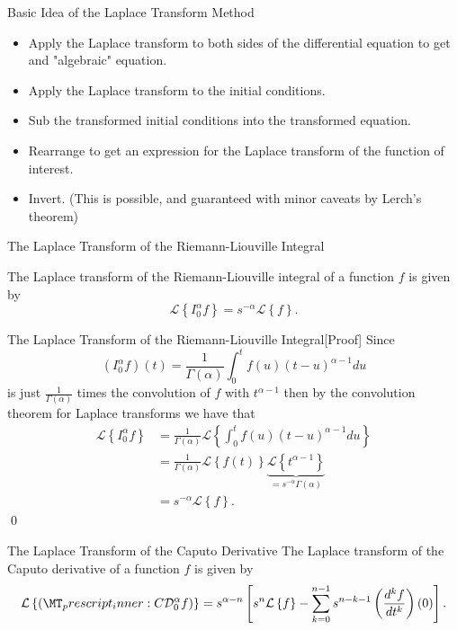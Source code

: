 \documentclass[pdf]{beamer}
\newcommand{\laplace}[1]{ \mathcal{L} \left\{ #1 \right\} }
\newcommand{\der}[3]{ \frac{d^{#3}#1}{d#2^{#3}} }
\newcommand{\capder}[3]{ \left( \prescript{C}{}{\mathcal{D}_{#1}^{#2}} #3 \right) }
\begin{document}
\begin{frame}{Basic Idea of the Laplace Transform Method}
	\begin{itemize}
		\item Apply the Laplace transform to both sides of the differential equation to get
		and "algebraic" equation.
		\item Apply the Laplace transform to the initial conditions. 
		\item Sub the transformed initial conditions into the transformed equation.
		\item Rearrange to get an expression for the Laplace transform of the function of interest.
		\item Invert. (This is possible, and guaranteed with minor caveats by Lerch's theorem)
	\end{itemize}
\end{frame}

\begin{frame}{The Laplace Transform of the Riemann-Liouville Integral}
	\begin{lemma}
	The Laplace transform of the Riemann-Liouville integral of a function $ f $ is given by
		$$ \mathcal{L} \left\{ I_0^\alpha f \right\}  = s^{-\alpha} \mathcal{L} \left\{ f \right\}.	$$
	\end{lemma}
\end{frame}

\begin{frame}{The Laplace Transform of the Riemann-Liouville Integral[Proof]}
	Since 
	$$
		 (I_0^\alpha f)(t) = \frac{1}{\Gamma(\alpha)} \int_0^t f(u) (t-u)^{\alpha - 1} du
	$$
	is just $ \frac{1}{\Gamma(\alpha)} $ times the convolution of $ f $ with $ t^{\alpha - 1} $ then by the convolution theorem
	for Laplace transforms we have that 
	\begin{align*}
		\mathcal{L} \left\{ I_0^\alpha f \right\} &= \frac{1}{\Gamma(\alpha)} \mathcal{L} \left\{ \int_{0}^{t} f(u) (t-u)^{\alpha - 1} du \right\} \\
			&= \frac{1}{\Gamma(\alpha)} \mathcal{L} \left\{ f(t) \right\} \underbrace{\mathcal{L} \left\{ t^{\alpha - 1} \right\}}_{=s^{-\alpha} \Gamma(\alpha)} \\
			&= s^{-\alpha} \mathcal{L} \left\{ f \right\}.
	\end{align*}
	\qed
\end{frame}

\begin{frame}{The Laplace Transform of the Caputo Derivative}
	The Laplace transform of the Caputo derivative of  a function $ f $ is given by
	\begin{align*}
		\laplace{\capder{0}{\alpha}{f}} = s^{\alpha - n} \left[ s^n \laplace{f} - \sum_{k=0}^{n-1} s^{n-k-1} \left( \der{f}{t}{k} \right)(0) \right].
	\end{align*}
\end{frame}
\end{document}
